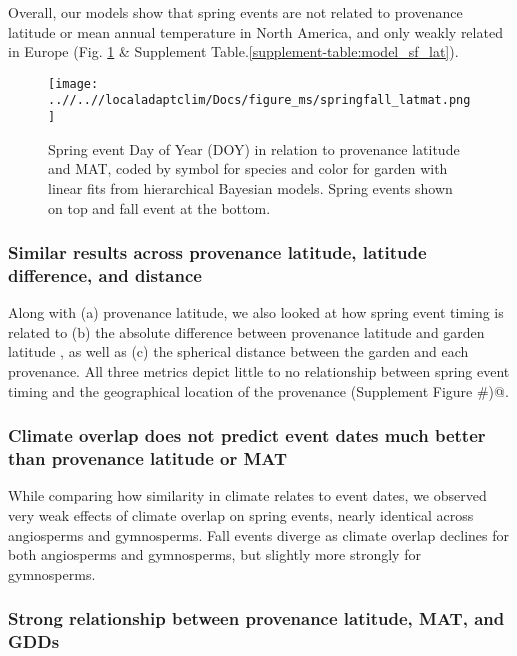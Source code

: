 \documentclass{article}
\begin{document}
Overall, our models show that spring events are not related to provenance latitude or mean annual temperature in North America, and only weakly related in Europe (Fig. \ref{figure:springfall_latmat} \& Supplement Table.\ref{supplement-table:model_sf_lat}). 


\begin{figure}[!h] 
    \centering
 \texttt{[image: ..//..//localadaptclim/Docs/figure\_ms/springfall\_latmat.png]}
    \caption{Spring event Day of Year (DOY) in relation to provenance latitude and MAT, coded by symbol for species and color for garden with linear fits from hierarchical Bayesian models. Spring events shown on top and fall event at the bottom.}
    \label{figure:springfall_latmat}
\end{figure}


\newpage

\subsubsection {Similar results across provenance latitude, latitude difference, and distance}
Along with (a) provenance latitude, we also looked at how spring event timing is related to (b) the absolute difference between provenance latitude and garden latitude , as well as (c) the spherical distance between the garden and each provenance. All three metrics depict little to no relationship between spring event timing and the geographical location of the provenance \verb@(Supplement Figure #)@.

\subsubsection {Climate overlap does not predict event dates much better than provenance latitude or MAT}

While comparing how similarity in climate relates to event dates, we observed very weak effects of climate overlap on spring events, nearly identical across angiosperms and gymnosperms. Fall events diverge as climate overlap declines for both angiosperms and gymnosperms, but slightly more strongly for gymnosperms.

\subsubsection {Strong relationship between provenance latitude, MAT, and GDDs}
\end{document}
